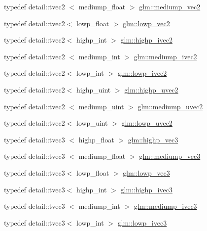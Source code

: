 \begin{DoxyCompactItemize}
\item 
typedef detail\-::tvec2\*
$<$ mediump\-\_\-float $>$ \hyperlink{group__core__precision_gaa19e624188c7908ba28b9ef829e076f2}{glm\-::mediump\-\_\-vec2}
\item 
typedef detail\-::tvec2$<$ lowp\-\_\-float $>$ \hyperlink{group__core__precision_ga158d9bb292b42c86b36e8eaff3b22394}{glm\-::lowp\-\_\-vec2}
\item 
typedef detail\-::tvec2$<$ highp\-\_\-int $>$ \hyperlink{group__core__precision_ga83738eb062e2e6b5e52cd0461da9c742}{glm\-::highp\-\_\-ivec2}
\item 
typedef detail\-::tvec2\*
$<$ mediump\-\_\-int $>$ \hyperlink{group__core__precision_ga4803c44369a1aea2e7e51397c341ce6f}{glm\-::mediump\-\_\-ivec2}
\item 
typedef detail\-::tvec2$<$ lowp\-\_\-int $>$ \hyperlink{group__core__precision_ga5e59209b39a7d334f8b4bad8c01ea045}{glm\-::lowp\-\_\-ivec2}
\item 
typedef detail\-::tvec2$<$ highp\-\_\-uint $>$ \hyperlink{group__core__precision_ga1c56d043a20a6db84fc3d18b227875fb}{glm\-::highp\-\_\-uvec2}
\item 
typedef detail\-::tvec2\*
$<$ mediump\-\_\-uint $>$ \hyperlink{group__core__precision_ga95f22fddbbb9561e648aaa2a461be59c}{glm\-::mediump\-\_\-uvec2}
\item 
typedef detail\-::tvec2$<$ lowp\-\_\-uint $>$ \hyperlink{group__core__precision_gacae56e02818d0da34e70ac934807388c}{glm\-::lowp\-\_\-uvec2}
\item 
typedef detail\-::tvec3\*
$<$ highp\-\_\-float $>$ \hyperlink{group__core__precision_gab660f8916a9c4a72bf71cd4279ae19fb}{glm\-::highp\-\_\-vec3}
\item 
typedef detail\-::tvec3\*
$<$ mediump\-\_\-float $>$ \hyperlink{group__core__precision_gafab50a7800793f88befe5d2a0120c65b}{glm\-::mediump\-\_\-vec3}
\item 
typedef detail\-::tvec3$<$ lowp\-\_\-float $>$ \hyperlink{group__core__precision_gaacc50c233ef2759c852eb90be78bc5fc}{glm\-::lowp\-\_\-vec3}
\item 
typedef detail\-::tvec3$<$ highp\-\_\-int $>$ \hyperlink{group__core__precision_ga8d03a7d21f89a6541a278bf78bb6b1fa}{glm\-::highp\-\_\-ivec3}
\item 
typedef detail\-::tvec3\*
$<$ mediump\-\_\-int $>$ \hyperlink{group__core__precision_gab824e682bc463998efbcd4a512ebf209}{glm\-::mediump\-\_\-ivec3}
\item 
typedef detail\-::tvec3$<$ lowp\-\_\-int $>$ \hyperlink{group__core__precision_ga61fed1e59be72903080596ebbaf2fac5}{glm\-::lowp\-\_\-ivec3}

\end{DoxyCompactItemize}
